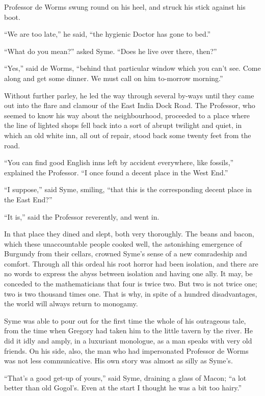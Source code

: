 \documentclass{book}
\begin{document}
Professor de Worms swung round on his heel, and struck his stick against his boot.

“We are too late,” he said, “the hygienic Doctor has gone to bed.”

“What do you mean?” asked Syme. “Does he live over there, then?”

“Yes,” said de Worms, “behind that particular window which you can’t see. Come along and get some dinner. We must call on him to-morrow morning.”

Without further parley, he led the way through several by-ways until they came out into the flare and clamour of the East India Dock Road. The Professor, who seemed to know his way about the neighbourhood, proceeded to a place where the line of lighted shops fell back into a sort of abrupt twilight and quiet, in which an old white inn, all out of repair, stood back some twenty feet from the road.

“You can find good English inns left by accident everywhere, like fossils,” explained the Professor. “I once found a decent place in the West End.”

“I suppose,” said Syme, smiling, “that this is the corresponding decent place in the East End?”

“It is,” said the Professor reverently, and went in.

In that place they dined and slept, both very thoroughly. The beans and bacon, which these unaccountable people cooked well, the astonishing emergence of Burgundy from their cellars, crowned Syme’s sense of a new comradeship and comfort. Through all this ordeal his root horror had been isolation, and there are no words to express the abyss between isolation and having one ally. It may, be conceded to the mathematicians that four is twice two. But two is not twice one; two is two thousand times one. That is why, in spite of a hundred disadvantages, the world will always return to monogamy.

Syme was able to pour out for the first time the whole of his outrageous tale, from the time when Gregory had taken him to the little tavern by the river. He did it idly and amply, in a luxuriant monologue, as a man speaks with very old friends. On his side, also, the man who had impersonated Professor de Worms was not less communicative. His own story was almost as silly as Syme’s.

“That’s a good get-up of yours,” said Syme, draining a glass of Macon; “a lot better than old Gogol’s. Even at the start I thought he was a bit too hairy.”
\end{document}
